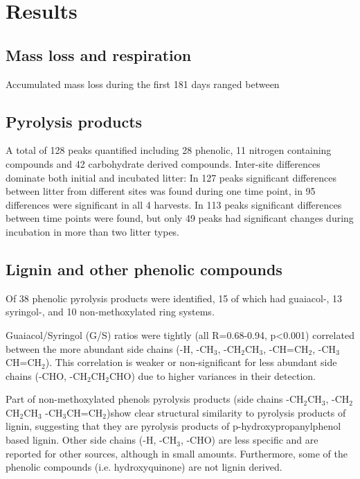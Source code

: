 \documentclass[preprint,review,12pt]{elsarticle}
\begin{document}
\section{Results}

\subsection{Mass loss and respiration}

Accumulated mass loss during the first 181 days ranged between

\subsection{Pyrolysis products}


A total of 128 peaks quantified including 28 phenolic, 11 nitrogen containing compounds and 42 carbohydrate derived compounds. Inter-site differences dominate both initial and incubated litter: In 127  peaks significant differences between litter from different sites was found during one time point, in 95 differences were significant in all 4 harvests. In 113 peaks significant differences between time points were found, but only 49 peaks had significant changes during incubation in more than two litter types.




\subsection{Lignin and other phenolic compounds}
Of 38 phenolic pyrolysis products were identified, 15 of which had guaiacol-, 13 syringol-, and 10 non-methoxylated ring systems.

Guaiacol/Syringol (G/S) ratios were tightly (all R=0.68-0.94, p<0.001) correlated between the more abundant side chains (-H, -CH$_3$, -CH$_2$CH$_3$, -CH=CH$_2$, -CH$_3$CH=CH$_2$). This correlation is weaker or non-significant for less abundant side chains (-CHO, -CH$_2$CH$_2$CHO) due to higher variances in their detection.

Part of non-methoxylated phenols pyrolysis products (side chains -CH$_2$CH$_3$, -CH$_2$CH$_2$CH$_3$ -CH$_3$CH=CH$_2$)show clear structural similarity to pyrolysis products of lignin, suggesting that they are pyrolysis products of p-hydroxypropanylphenol based lignin. Other side chains (-H, -CH$_3$, -CHO) are less specific and are reported for other sources, although in small amounts. Furthermore, some of the phenolic compounds (i.e. hydroxyquinone) are not lignin derived.
\end{document}
